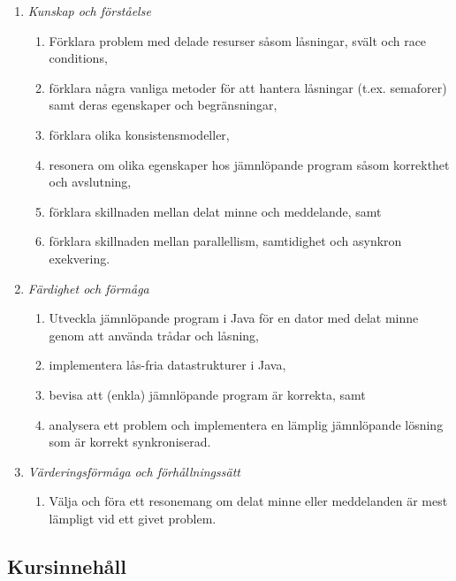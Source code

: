 \begin{enumerate}
\def\labelenumi{\Alph{enumi}.}
\tightlist
\item
  \emph{Kunskap och förståelse}

  \begin{enumerate}
  \def\labelenumii{\Alph{enumi}.\arabic{enumii}.}
  \tightlist
  \item
    Förklara problem med delade resurser såsom låsningar, svält och race
    conditions,
  \item
    förklara några vanliga metoder för att hantera låsningar (t.ex.
    semaforer) samt deras egenskaper och begränsningar,
  \item
    förklara olika konsistensmodeller,
  \item
    resonera om olika egenskaper hos jämnlöpande program såsom
    korrekthet och avslutning,
  \item
    förklara skillnaden mellan delat minne och meddelande, samt
  \item
    förklara skillnaden mellan parallellism, samtidighet och asynkron
    exekvering.
  \end{enumerate}
\item
  \emph{Färdighet och förmåga}

  \begin{enumerate}
  \def\labelenumii{\Alph{enumi}.\arabic{enumii}.}
  \tightlist
  \item
    Utveckla jämnlöpande program i Java för en dator med delat minne
    genom att använda trådar och låsning,
  \item
    implementera lås-fria datastrukturer i Java,
  \item
    bevisa att (enkla) jämnlöpande program är korrekta, samt
  \item
    analysera ett problem och implementera en lämplig jämnlöpande
    lösning som är korrekt synkroniserad.
  \end{enumerate}
\item
  \emph{Värderingsförmåga och förhållningssätt}

  \begin{enumerate}
  \def\labelenumii{\Alph{enumi}.\arabic{enumii}.}
  \tightlist
  \item
    Välja och föra ett resonemang om delat minne eller meddelanden är
    mest lämpligt vid ett givet problem.
  \end{enumerate}
\end{enumerate}

\subsection*{Kursinnehåll}

